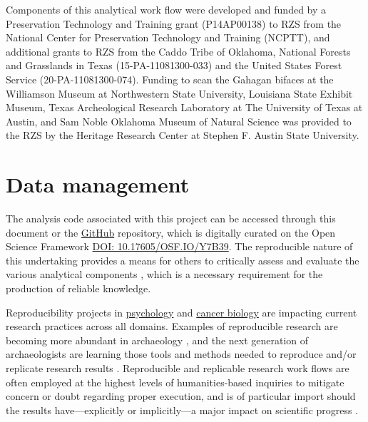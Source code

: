 \documentclass[]{interact}
\theoremstyle{plain}%
\theoremstyle{definition}
\theoremstyle{remark}
\begin{document}
Components of this analytical work flow were developed and funded by a
Preservation Technology and Training grant (P14AP00138) to RZS from the
National Center for Preservation Technology and Training (NCPTT), and
additional grants to RZS from the Caddo Tribe of Oklahoma, National
Forests and Grasslands in Texas (15-PA-11081300-033) and the United
States Forest Service (20-PA-11081300-074). Funding to scan the Gahagan
bifaces at the Williamson Museum at Northwestern State University,
Louisiana State Exhibit Museum, Texas Archeological Research Laboratory
at The University of Texas at Austin, and Sam Noble Oklahoma Museum of
Natural Science was provided to the RZS by the Heritage Research Center
at Stephen F. Austin State University.

\hypertarget{data-management}{%
\section*{Data management}\label{data-management}}

The analysis code associated with this project can be accessed through
this document or the
\href{https://github.com/seldenlab/gahaganmorph.3}{GitHub} repository,
which is digitally curated on the Open Science Framework
\href{https://osf.io/y7b39/}{DOI: 10.17605/OSF.IO/Y7B39}. The
reproducible nature of this undertaking provides a means for others to
critically assess and evaluate the various analytical components
\citep{RN20915, RN20916, RN20917}, which is a necessary requirement for
the production of reliable knowledge.

Reproducibility projects in \href{https://osf.io/ezcuj/}{psychology} and
\href{https://www.cos.io/rpcb}{cancer biology} are impacting current
research practices across all domains. Examples of reproducible research
are becoming more abundant in archaeology
\citep{RN20804, RN21009, RN11783, RN21001, RN9364}, and the next
generation of archaeologists are learning those tools and methods needed
to reproduce and/or replicate research results \citep{RN21007}.
Reproducible and replicable research work flows are often employed at
the highest levels of humanities-based inquiries to mitigate concern or
doubt regarding proper execution, and is of particular import should the
results have---explicitly or implicitly---a major impact on scientific
progress \citep{RN21008}.






\end{document}

